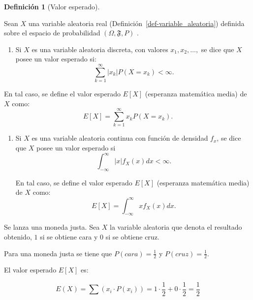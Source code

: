 \documentclass[
  us-letterpaper,
]{scrreprt}
\providecommand{\tightlist}{%
  \setlength{\itemsep}{0pt}\setlength{\parskip}{0pt}}\usepackage{longtable,booktabs,array}
\theoremstyle{plain}
\theoremstyle{plain}
\theoremstyle{definition}
\newtheorem{definition}{Definición}[chapter]
\theoremstyle{remark}
\begin{document}
\begin{definition}[Valor
esperado]\protect\hypertarget{def-valor_esperado}{}\label{def-valor_esperado}

Sean \(X\) una variable aleatoria real
(Definición~\ref{def-variable_aleatoria}) definida sobre el espacio de
probabilidad \((\Omega, \mathfrak{F}, P)\) .

\begin{enumerate}
\def\labelenumi{\arabic{enumi}.}
\tightlist
\item
  Si \(X\) es una variable aleatoria discreta, con valores
  \(x_1, x_2, \dots,\) se dice que \(X\) posee un valor esperado si:\\
  \[\sum_{k=1}^{\infty} |x_k| P(X = x_k) < \infty.\]
\end{enumerate}

En tal caso, se define el valor esperado \(E[X]\) (esperanza matemática
media) de \(X\) como: \[E[X] = \sum_{k=1}^{\infty} x_k P(X = x_k).\]

\begin{enumerate}
\def\labelenumi{\arabic{enumi}.}
\setcounter{enumi}{1}
\item
  Si \(X\) es una variable aleatoria continua con función de densidad
  \(f_x\), se dice que \(X\) posee un valor esperado si
  \[\int_{-\infty}^{\infty} |x| f_X(x)dx < \infty.\]

  En tal caso, se define el valor esperado \(E[X]\) (esperanza
  matemática media) de \(X\) como:
  \[E[X] = \int_{-\infty}^{\infty} xf_X(x) dx.\]
\end{enumerate}

\end{definition}

\begin{tcolorbox}[enhanced jigsaw, titlerule=0mm, opacityback=0, coltitle=black, bottomrule=.15mm, colbacktitle=quarto-callout-caution-color!10!white, toprule=.15mm, colback=white, arc=.35mm, colframe=quarto-callout-caution-color-frame, leftrule=.75mm, bottomtitle=1mm, left=2mm, toptitle=1mm, opacitybacktitle=0.6, breakable, title={Ejemplo (\textbf{\emph{Valor Esperado}})}, rightrule=.15mm]

Se lanza una moneda justa. Sea \(X\) la variable aleatoria que denota el
resultado obtenido, \(1\) si se obtiene cara y \(0\) si se obtiene cruz.

Para una moneda justa se tiene que \(P(cara)= \frac{1}{2}\) y
\(P(cruz)=\frac{1}{2}\).

El valor esperado \(E[X]\) es:

\[
E(X) = \sum(x_i \cdot P(x_i)) = 1\cdot \frac{1}{2} + 0 \cdot \frac{1}{2} = \frac{1}{2}
\]

\end{tcolorbox}
\end{document}
